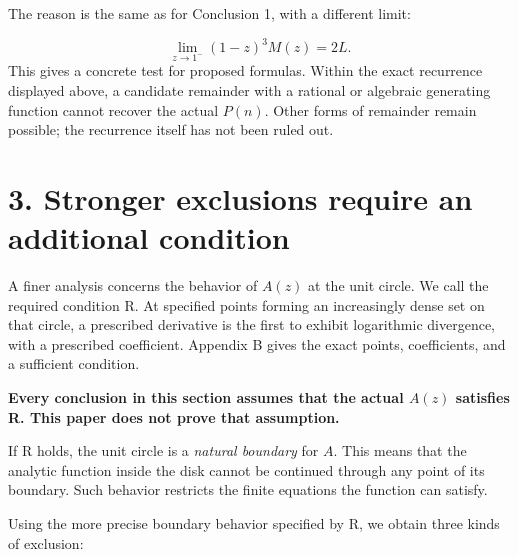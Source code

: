 \documentclass[11pt,a4paper]{article}
\begin{document}
The reason is the same as for Conclusion 1, with a different limit:

\[
\lim_{z\to1^-}(1-z)^3M(z)=2L.
\]
This gives a concrete test for proposed formulas. Within the exact recurrence displayed above, a candidate remainder with a rational or algebraic generating function cannot recover the actual $P(n)$. Other forms of remainder remain possible; the recurrence itself has not been ruled out.

\section*{3. Stronger exclusions require an additional condition}
A finer analysis concerns the behavior of $A(z)$ at the unit circle. We call the required condition R. At specified points forming an increasingly dense set on that circle, a prescribed derivative is the first to exhibit logarithmic divergence, with a prescribed coefficient. Appendix B gives the exact points, coefficients, and a sufficient condition.

\textbf{Every conclusion in this section assumes that the actual $A(z)$ satisfies R. This paper does not prove that assumption.}

If R holds, the unit circle is a \emph{natural boundary} for $A$. This means that the analytic function inside the disk cannot be continued through any point of its boundary. Such behavior restricts the finite equations the function can satisfy.

Using the more precise boundary behavior specified by R, we obtain three kinds of exclusion:
\end{document}
